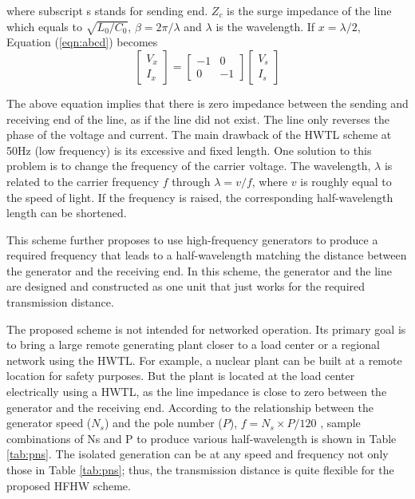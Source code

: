 \documentclass[12pt,a4paper]{reportmod}
\begin{document}
where subscript s stands for sending end. $Z_c$ is the surge impedance of the line which equals to $\sqrt{L_0/C_0}$, $\beta=2\pi/\lambda$ and $\lambda$ is the wavelength. If $x=\lambda /2$, Equation (\ref{eqn:abcd}) becomes
\begin{equation}
\begin{bmatrix}
V_x\\
I_x
\end{bmatrix}
=
\begin{bmatrix}
-1 & 0\\
0 & -1
\end{bmatrix}
\begin{bmatrix}
V_s\\
I_s
\end{bmatrix}
\end{equation}
\par The above equation implies that there is zero impedance between the sending and receiving end of the line, as if the line did not exist. The line only reverses the phase of the voltage and current. The main drawback of the HWTL scheme at 50Hz (low frequency) is its excessive and fixed length. One solution to this problem is to change the frequency of the carrier voltage. The wavelength, $\lambda$ is related to the carrier frequency $f$ through $\lambda =v/f$, where $v$ is roughly equal to the speed of light. If the frequency is raised, the corresponding half-wavelength length can be shortened.
\par This scheme further proposes to use high-frequency generators to produce a required frequency that leads to a half-wavelength matching the distance between the generator and the receiving end. In this scheme, the generator and the line are designed and constructed as one unit that just works for the required transmission distance.
\par The proposed scheme is not intended for networked operation. Its primary goal is to bring a large remote generating plant closer to a load center or a regional network using the HWTL. For example, a nuclear plant can be built at a remote location for safety purposes. But the plant is located at the load center electrically using a HWTL, as the line impedance is close to zero between the generator and the receiving end. According to the relationship between the generator speed ($N_s$) and the pole number ($P$), $f=N_s \times P / 120$ , sample combinations of Ns and P to produce various half-wavelength is shown in Table \ref{tab:pns}. The isolated generation can be at any speed and frequency not only those in Table \ref{tab:pns}; thus, the transmission distance is quite flexible for the proposed HFHW scheme.
\end{document}
